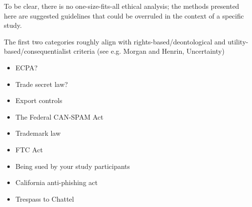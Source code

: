 To be clear, there is no one-size-fits-all ethical analysis; the methods presented here are suggested guidelines that could be overruled in the context of a specific study.




The first two categories roughly align with rights-based/deontological and utility-based/consequentialist criteria (see e.g. Morgan and Henrin, Uncertainty)







\begin{itemize}
\item ECPA? \cite{parkResearchersGuideLegal}
\item Trade secret law? \cite{parkResearchersGuideLegal}
\item Export controls \cite{parkResearchersGuideLegal}
\item The Federal CAN-SPAM Act \cite{phishing-book}
\item Trademark law
\cite{phishing-book,soghoian2008legal}
\item FTC Act \cite{phishing-book}
\item Being sued by your study participants \cite{phishing-book}
\item California anti-phishing act \cite{soghoian2008legal}
\item Trespass to Chattel \cite{soghoian2008legal}
\end{itemize}




